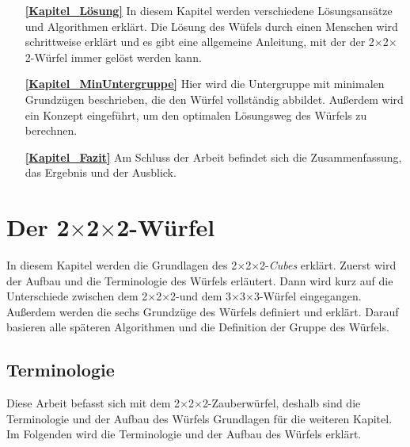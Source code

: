 \documentclass[12pt,a4paper, usenames, dvipsnames]{article}
\theoremstyle{mystyle}
\theoremstyle{definition}
\newcommand{\Ttwo}{2$\times$2$\times$2-}
\newcommand{\Tthree}{3$\times$3$\times$3-}
\begin{document}
\begin{itemize}
\item[\textbf{\ref{Kapitel_Lösung}}] In diesem Kapitel werden verschiedene Lösungsansätze und Algorithmen erklärt. Die Lösung des Wüfels durch einen Menschen wird schrittweise erklärt und es gibt eine allgemeine Anleitung, mit der der \Ttwo Würfel immer gelöst werden kann.

\item[\textbf{\ref{Kapitel_MinUntergruppe}}] Hier wird die Untergruppe mit minimalen Grundzügen beschrieben, die den Würfel vollständig abbildet. Außerdem wird ein Konzept eingeführt, um den optimalen Lösungsweg des Würfels zu berechnen.  

\item[\textbf{\ref{Kapitel_Fazit}}] Am Schluss der Arbeit befindet sich die Zusammenfassung, das Ergebnis und der Ausblick.

\end{itemize}


%
%
%
%
%
%
%
%
%
%
%
%
\newpage
\section{Der \Ttwo Würfel}

\label{Kapitel_Würfel}

In diesem Kapitel werden die Grundlagen des \Ttwo \textit{Cubes} erklärt. Zuerst wird der Aufbau und die Terminologie des Würfels erläutert. Dann wird kurz auf die Unterschiede zwischen dem \Ttwo und dem \Tthree Würfel eingegangen. 
Außerdem werden die sechs Grundzüge des Würfels definiert und erklärt. Darauf basieren alle späteren Algorithmen und die Definition der Gruppe des Würfels.


%
%
%
%
%
%
%
%
%
%
\subsection{Terminologie}

Diese Arbeit befasst sich mit dem \Ttwo Zauberwürfel, deshalb sind die Terminologie und der Aufbau des Würfels Grundlagen für die weiteren Kapitel.
Im Folgenden wird die Terminologie und der Aufbau des Würfels erklärt.
\end{document}
